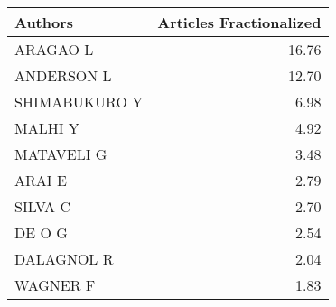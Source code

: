 
\begin{tabular}{lr}
\toprule
Authors & Articles Fractionalized\\
\midrule
ARAGAO L & 16.76\\
ANDERSON L & 12.70\\
SHIMABUKURO Y & 6.98\\
MALHI Y & 4.92\\
MATAVELI G & 3.48\\
\addlinespace
ARAI E & 2.79\\
SILVA C & 2.70\\
DE O G & 2.54\\
DALAGNOL R & 2.04\\
WAGNER F & 1.83\\
\bottomrule
\end{tabular}